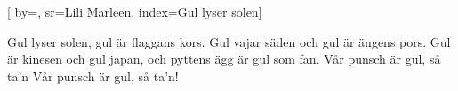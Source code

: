 

[ 		%
	by={},					%
	sr={Lili Marleen},					%
	index={Gul lyser solen}]						%
	

\beginverse*						%
Gul lyser solen, gul är flaggans kors.
Gul vajar säden och gul är ängens pors.
Gul är kinesen och gul japan,
och pyttens ägg är gul som fan.
Vår punsch är gul, så ta'n
Vår punsch är gul, så ta'n!
\endverse							%

\vspace{5mm}
\endsong							%